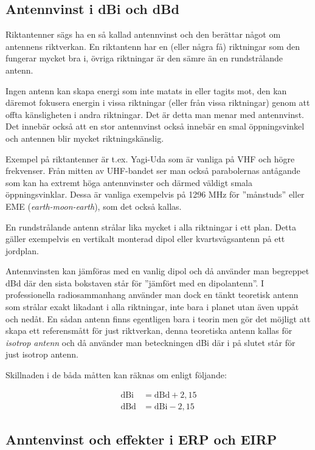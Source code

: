 \subsection{Antennvinst i dBi och dBd}

Riktantenner sägs ha en så kallad antennvinst och den berättar något om
antennens riktverkan. En riktantenn har en (eller några få) riktningar som den
fungerar mycket bra i, övriga riktningar är den sämre än en rundstrålande
antenn.

Ingen antenn kan skapa energi som inte matats in eller tagits mot, den kan
däremot fokusera energin i vissa riktningar (eller från vissa riktningar)
genom att offta känsligheten i andra riktningar. Det är detta man menar med
antennvinst. Det innebär också att en stor antennvinst också innebär en smal
öppningsvinkel och antennen blir mycket riktningskänslig.

Exempel på riktantenner är t.ex. Yagi-Uda som är vanliga på VHF och högre
frekvenser. Från mitten av UHF-bandet ser man också parabolernas antågande som
kan ha extremt höga antennvinster och därmed väldigt smala
öppningsvinklar. Dessa är vanliga exempelvis på 1296 MHz för ''månstuds''
eller EME ({\it earth-moon-earth}), som det också kallas.

En rundstrålande antenn strålar lika mycket i alla riktningar i ett plan.
Detta gäller exempelvis en vertikalt monterad dipol eller kvartsvågsantenn på
ett jordplan.

Antennvinsten kan jämföras med en vanlig dipol och då använder man begreppet
dBd där den sista bokstaven står för ''jämfört med en dipolantenn''. I
professionella radiosammanhang använder man dock en tänkt teoretisk antenn som
strålar exakt likadant i alla riktningar, inte bara i planet utan även uppåt
och nedåt. En sådan antenn finns egentligen bara i teorin men gör det möjligt
att skapa ett referensmått för just riktverkan, denna teoretiska antenn kallas
för {\it isotrop antenn} och då använder man beteckningen dBi där i på slutet står
för just isotrop antenn.

Skillnaden i de båda måtten kan räknas om enligt följande:

\begin{align}
\text{dBi} &= \text{dBd} + 2,15\\
\text{dBd} &= \text{dBi} - 2,15
\end{align}

\subsection{Anntenvinst och effekter i ERP och EIRP}

